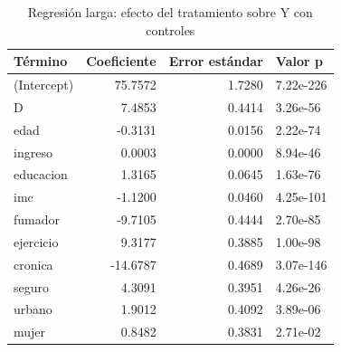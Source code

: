 
\begin{longtable}[t]{lrrl}
\caption{Regresión larga: efecto del tratamiento sobre Y con controles}\\
\toprule
Término & Coeficiente & Error estándar & Valor p\\
\midrule
(Intercept) & 75.7572 & 1.7280 & 7.22e-226\\
D & 7.4853 & 0.4414 & 3.26e-56\\
edad & -0.3131 & 0.0156 & 2.22e-74\\
ingreso & 0.0003 & 0.0000 & 8.94e-46\\
educacion & 1.3165 & 0.0645 & 1.63e-76\\
imc & -1.1200 & 0.0460 & 4.25e-101\\
fumador & -9.7105 & 0.4444 & 2.70e-85\\
ejercicio & 9.3177 & 0.3885 & 1.00e-98\\
cronica & -14.6787 & 0.4689 & 3.07e-146\\
seguro & 4.3091 & 0.3951 & 4.26e-26\\
urbano & 1.9012 & 0.4092 & 3.89e-06\\
mujer & 0.8482 & 0.3831 & 2.71e-02\\
\bottomrule
\end{longtable}
